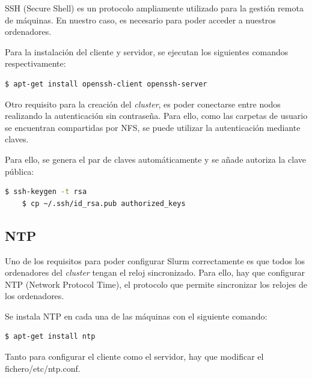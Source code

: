 SSH (Secure Shell) es un protocolo ampliamente utilizado para la gestión remota de máquinas. En nuestro caso, es necesario para poder acceder a nuestros ordenadores.
\vspace{2mm}


Para la instalación del cliente y servidor, se ejecutan los siguientes comandos respectivamente:
\vspace{2mm}

\begin{lstlisting}[language=bash]
    $ apt-get install openssh-client openssh-server
\end{lstlisting} 
\vspace{2mm}

Otro requisito para la creación del \emph{cluster}, es poder conectarse entre nodos realizando la autenticación sin contraseña. Para ello, como las carpetas de usuario se encuentran compartidas por NFS, se puede utilizar la autenticación mediante claves.
\vspace{2mm}

Para ello, se genera el par de claves automáticamente y se añade autoriza la clave pública:

\begin{lstlisting}[language=bash]
    $ ssh-keygen -t rsa
    $ cp ~/.ssh/id_rsa.pub authorized_keys
\end{lstlisting} 

\subsection{NTP}
\vspace{2mm}

Uno de los requisitos para poder configurar Slurm correctamente es que todos los ordenadores del \emph{cluster} tengan el reloj sincronizado. Para ello, hay que configurar NTP (Network Protocol Time), el protocolo que permite sincronizar los relojes de los ordenadores.
\vspace{4mm}

Se instala NTP en cada una de las máquinas con el siguiente comando:

\begin{lstlisting}[language=bash]
    $ apt-get install ntp
\end{lstlisting}
\vspace{4mm}

Tanto para configurar el cliente como el servidor, hay que modificar el fichero\newline /etc/ntp.conf.
\vspace{2mm}

